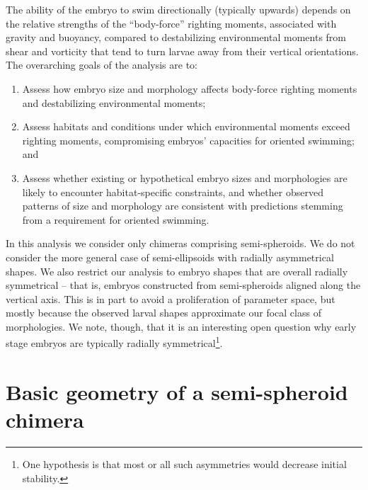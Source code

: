 \documentclass[10pt,a4paper]{article}
\begin{document}
The ability of the embryo to swim directionally (typically upwards) depends on the relative strengths of the ``body-force'' righting moments, associated with gravity and buoyancy, compared to destabilizing environmental moments from shear and vorticity that tend to turn larvae away from their vertical orientations.
The overarching goals of the analysis are to:
\begin{enumerate}
	\item Assess how embryo size and morphology affects body-force righting moments and destabilizing environmental moments; 
	\item Assess habitats and conditions under which environmental moments exceed righting moments, compromising embryos' capacities for oriented swimming; and 
	\item Assess whether existing or hypothetical embryo sizes and morphologies are likely to encounter habitat-specific constraints, and whether observed patterns of size and morphology are consistent with predictions stemming from a requirement for oriented swimming.
\end{enumerate}
In this analysis we consider only chimeras comprising semi-spheroids.
We do not consider the more general case of semi-ellipsoids with radially asymmetrical shapes.
We also restrict our analysis to embryo shapes that are overall radially symmetrical -- that is, embryos constructed from semi-spheroids aligned along the vertical axis. 
This is in part to avoid a proliferation of parameter space, but mostly because the observed larval shapes approximate our focal class of morphologies. 
We note, though, that it is an interesting open question why early stage embryos are typically radially symmetrical\footnote{One hypothesis is that most or all such asymmetries would decrease initial stability.}. 

\section{Basic geometry of a semi-spheroid chimera}\label{GeomSect}
\end{document}
